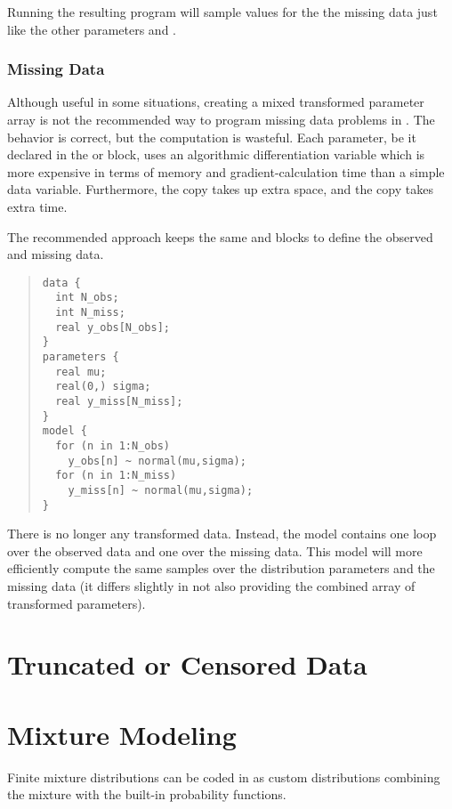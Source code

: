Running the resulting program will sample values for the the missing
data  just like the other parameters  and
.

\subsection{Missing Data}

Although useful in some situations, creating a mixed transformed
parameter array is not the recommended way to program missing data
problems in \Stan.  The behavior is correct, but the computation is
wasteful.  Each parameter, be it declared in the  or
 block, uses an algorithmic
differentiation variable which is more expensive in terms of memory
and gradient-calculation time than a simple data variable.
Furthermore, the copy takes up extra space, and the copy takes extra
time.

The recommended approach keeps the same  and
 blocks to define the observed and missing data.
%
\begin{quote}
\begin{Verbatim}
data {
  int N_obs;
  int N_miss;
  real y_obs[N_obs];
}
parameters {
  real mu;
  real(0,) sigma;
  real y_miss[N_miss];
}
model {
  for (n in 1:N_obs)
    y_obs[n] ~ normal(mu,sigma);
  for (n in 1:N_miss)
    y_miss[n] ~ normal(mu,sigma);
}
\end{Verbatim}
\end{quote}
%
There is no longer any transformed data.  Instead, the model contains
one loop over the observed data and one over the missing data.  This
model will more efficiently compute the same samples over the
distribution parameters and the missing data (it differs slightly in
not also providing the combined array  of transformed parameters).




\chapter{Truncated or Censored Data}



\chapter{Mixture Modeling}

Finite mixture distributions can be coded in \Stan as custom
distributions combining the mixture with the built-in probability
functions.  

